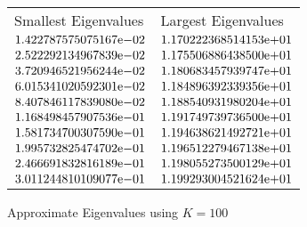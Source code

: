 \begin{enumerate}
\begin{figure}[tbh]
 \centering    
\begin{tabular}{ ||p{6cm}||p{6cm}|}
\hline
 Smallest Eigenvalues & Largest Eigenvalues \\ \hhline{|=|=|}   
\hline
${1.422787575075167}\mathrm{e}{-02}$ & ${1.170222368514153}\mathrm{e}{+01}$ \\  
${2.522292134967839}\mathrm{e}{-02}$ & ${1.175506886438500}\mathrm{e}{+01}$ \\  
${3.720946521956244}\mathrm{e}{-02}$ & ${1.180683457939747}\mathrm{e}{+01}$ \\  
${6.015341020592301}\mathrm{e}{-02}$ & ${1.184896392339356}\mathrm{e}{+01}$ \\  
${8.407846117839080}\mathrm{e}{-02}$ & ${1.188540931980204}\mathrm{e}{+01}$ \\  
${1.168498457907536}\mathrm{e}{-01}$ & ${1.191749739736500}\mathrm{e}{+01}$ \\  
${1.581734700307590}\mathrm{e}{-01}$ & ${1.194638621492721}\mathrm{e}{+01}$ \\  
${1.995732825474702}\mathrm{e}{-01}$ & ${1.196512279467138}\mathrm{e}{+01}$ \\  
${2.466691832816189}\mathrm{e}{-01}$ & ${1.198055273500129}\mathrm{e}{+01}$ \\  
${3.011244810109077}\mathrm{e}{-01}$ & ${1.199293004521624}\mathrm{e}{+01}$ \\  
\hline  
\end{tabular} 
\caption{Approximate Eigenvalues using $K = 100$}
   \label{tab:app_eig_100}
\end{figure} 



\end{enumerate}
